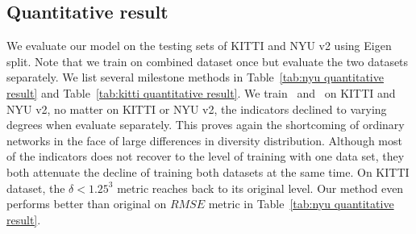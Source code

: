 \documentclass{svjour3}                     %
\begin{document}
\subsection{Quantitative result}
We evaluate our model on the testing sets of KITTI and NYU v2 
using Eigen split. Note that we train on combined dataset once 
but evaluate the two datasets separately. We list several 
milestone
methods in Table~\ref{tab:nyu quantitative result} and
Table~\ref{tab:kitti quantitative result}. We train~\cite{DABC} and~\cite{bts}
on KITTI and NYU v2, no matter on KITTI or NYU v2, the indicators 
declined to varying degrees when evaluate separately. This proves again the
shortcoming of ordinary networks in the face of large differences in diversity
distribution. Although most of the indicators does not recover to the level of
training with one data set, they both attenuate the decline of training both
datasets at the same time. On KITTI dataset, the $\delta<1.25^3$ metric
reaches back to its original level. Our method even performs better than original on $RMSE$ metric in Table~\ref{tab:nyu quantitative result}.
\end{document}

